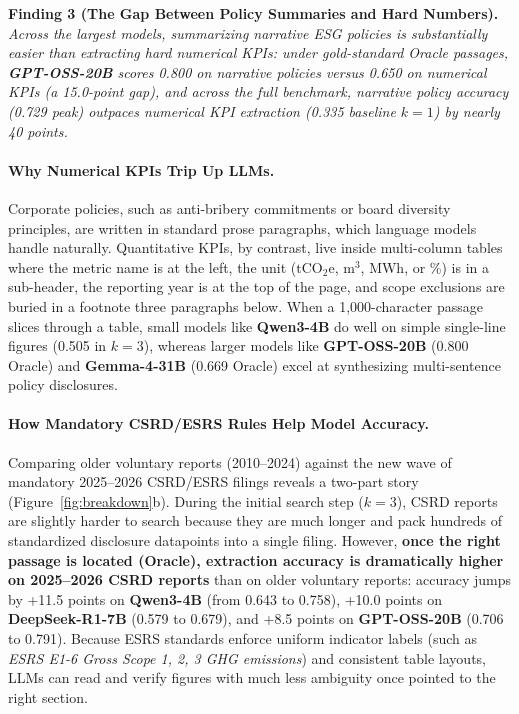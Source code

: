 \documentclass[11pt,letterpaper]{article}
\newcommand{\model}[1]{\textbf{#1}}
\begin{document}


\noindent\textbf{Finding 3 (The Gap Between Policy Summaries and Hard Numbers).}
\textit{Across the largest models, summarizing narrative ESG policies is substantially easier than extracting hard numerical KPIs: under gold-standard Oracle passages, \model{GPT-OSS-20B} scores 0.800 on narrative policies versus 0.650 on numerical KPIs (a 15.0-point gap), and across the full benchmark, narrative policy accuracy (0.729 peak) outpaces numerical KPI extraction (0.335 baseline $k=1$) by nearly 40 points.}

\paragraph{Why Numerical KPIs Trip Up LLMs.}
Corporate policies, such as anti-bribery commitments or board diversity principles, are written in standard prose paragraphs, which language models handle naturally. Quantitative KPIs, by contrast, live inside multi-column tables where the metric name is at the left, the unit ($\text{tCO}_2\text{e}$, $\text{m}^3$, MWh, or \%) is in a sub-header, the reporting year is at the top of the page, and scope exclusions are buried in a footnote three paragraphs below. When a 1,000-character passage slices through a table, small models like \model{Qwen3-4B} do well on simple single-line figures (0.505 in $k=3$), whereas larger models like \model{GPT-OSS-20B} (0.800 Oracle) and \model{Gemma-4-31B} (0.669 Oracle) excel at synthesizing multi-sentence policy disclosures.

\paragraph{How Mandatory CSRD/ESRS Rules Help Model Accuracy.}
Comparing older voluntary reports (2010--2024) against the new wave of mandatory 2025--2026 CSRD/ESRS filings reveals a two-part story (Figure~\ref{fig:breakdown}b). During the initial search step ($k=3$), CSRD reports are slightly harder to search because they are much longer and pack hundreds of standardized disclosure datapoints into a single filing. However, \textbf{once the right passage is located (Oracle), extraction accuracy is dramatically higher on 2025--2026 CSRD reports} than on older voluntary reports: accuracy jumps by +11.5 points on \model{Qwen3-4B} (from 0.643 to 0.758), +10.0 points on \model{DeepSeek-R1-7B} (0.579 to 0.679), and +8.5 points on \model{GPT-OSS-20B} (0.706 to 0.791). Because ESRS standards enforce uniform indicator labels (such as \textit{ESRS E1-6 Gross Scope 1, 2, 3 GHG emissions}) and consistent table layouts, LLMs can read and verify figures with much less ambiguity once pointed to the right section.
\end{document}
